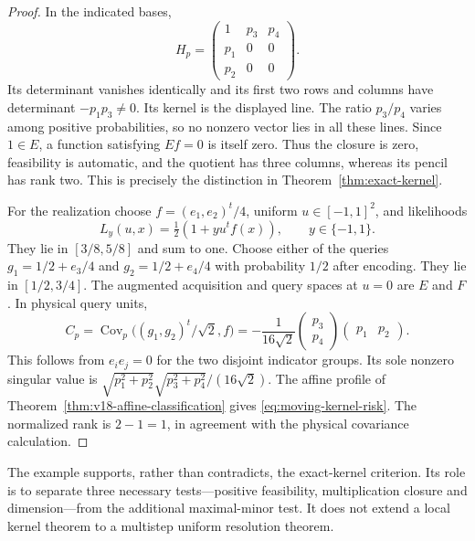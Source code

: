 \begin{proof}
In the indicated bases,
\[
 H_p=\begin{pmatrix}1&p_3&p_4\\p_1&0&0\\p_2&0&0\end{pmatrix}.
\]
Its determinant vanishes identically and its first two rows and columns
have determinant $-p_1p_3\ne0$. Its kernel is the displayed line.
The ratio $p_3/p_4$ varies among positive probabilities, so no nonzero
vector lies in all these lines. Since $1\in E$, a function satisfying
$Ef=0$ is itself zero. Thus the closure is zero, feasibility is automatic,
and the quotient has three columns, whereas its pencil has rank two.
This is precisely the distinction in Theorem~\ref{thm:exact-kernel}.

For the realization choose $f=(e_1,e_2)^t/4$, uniform
$u\in[-1,1]^2$, and likelihoods
\[
 L_y(u,x)=\tfrac12(1+y u^tf(x)),\qquad y\in\{-1,1\}.
\]
They lie in $[3/8,5/8]$ and sum to one. Choose either of the queries
$g_1=1/2+e_3/4$ and $g_2=1/2+e_4/4$ with probability $1/2$
after encoding. They lie in $[1/2,3/4]$. The augmented acquisition
and query spaces at $u=0$ are $E$ and $F$. In physical query units,
\[
 C_p=\operatorname{Cov}_p\bigl((g_1,g_2)^t/\sqrt2,f\bigr)
 =-\frac1{16\sqrt2}
       \begin{pmatrix}p_3\\p_4\end{pmatrix}
       \begin{pmatrix}p_1&p_2\end{pmatrix}.
\]
This follows from $e_i e_j=0$ for the two disjoint indicator groups.
Its sole nonzero singular value is
$\sqrt{p_1^2+p_2^2}\sqrt{p_3^2+p_4^2}/(16\sqrt2)$.
The affine profile of Theorem~\ref{thm:v18-affine-classification} gives
\eqref{eq:moving-kernel-risk}. The normalized rank is $2-1=1$,
in agreement with the physical covariance calculation.
\end{proof}

The example supports, rather than contradicts, the exact-kernel
criterion. Its role is to separate three necessary tests---positive
feasibility, multiplication closure and dimension---from the additional
maximal-minor test. It does not extend a local kernel theorem to a
multistep uniform resolution theorem.
